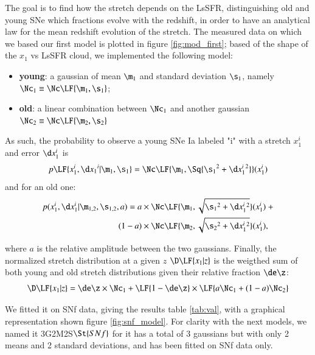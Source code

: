 \documentclass[]{aa} %
\begin{document}
The goal is to find how the stretch depends on the LsSFR, distinguishing old and
young SNe which fractions evolve with the redshift, in order to have an
analytical law for the mean redshift evolution of the stretch. The measured data
on which we based our first model is plotted in figure \ref{fig:mod_first};
based of the shape of the $x_1$ vs LsSFR cloud, we implemented the following
model:
\begin{itemize}
    \item \textbf{young}: a gaussian of mean $\m_1$ and standard deviation
        $\s_1$, namely $\Nc_1 \equiv \Nc \LF{\m_1,\s_1}$;
    \item \textbf{old}: a linear combination between $\Nc_1$ and another
        gaussian $\Nc_2 \equiv \Nc \LF{\m_2,\s_2}$
\end{itemize}
As such, the probability to observe a young SNe Ia labeled "i" with a stretch
$x_1^i$ and error $\d x_1^i$ is
\begin{equation}
    p \LF{x_1^i, \d x_1{}^i|\m_1,\s_1} = \Nc \LF{\m_1, \Sq{\s_1{}^2 + \d
    x_1^i{}^2}}(x_1^i)
\end{equation}
and for an old one:
\begin{align}
    p(x_1^i, \d x_1^i | \m_{1,2}, \s_{1,2}, a) = a & \times \Nc \LF{\m_1,
    \sqrt{\s_1{}^2 + \d x_1^i{}^{2}}} (x_1^i) \ + \\ (1-a) & \times \Nc
    \LF{\m_2, \sqrt{ \s_2{}^2 + \d x_1^i{}^{2}}} (x_1^i), \nonumber 
\end{align}

\noindent where $a$ is the relative amplitude between the two gaussians.
Finally, the normalized stretch distribution at a given $z$ $\D\LF{x_1|z}$ is
the weigthed sum of both young and old stretch distributions given their
relative fraction $\de\z$:
\begin{equation}
    \D\LF{x_1|z} = \de\z\times\Nc_1 +
    \LF{1-\de\z} \times \LF{a\Nc_1 + (1-a)\Nc_2}
\end{equation}

We fitted it on SNf data, giving the results table \ref{tab:val}, with a graphical representation shown figure \ref{fig:snf_model}. For clarity
with the next models, we named it 3G2M2S$\St{SNf}$ for it has a total of 3
gaussians but with only 2 means and 2 standard deviations, and has been fitted
on SNf data only. 
\end{document}
